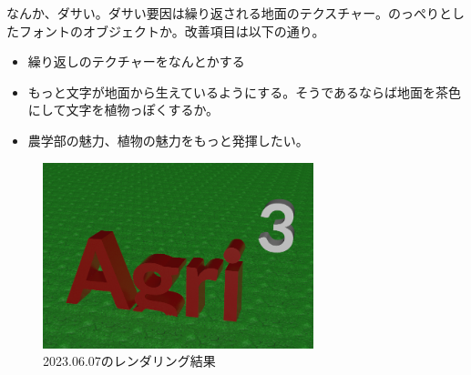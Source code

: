 \documentclass[uplatex,dvipdfmx]{jsarticle}
\begin{document}
なんか、ダサい。ダサい要因は繰り返される地面のテクスチャー。のっぺりとしたフォントのオブジェクトか。改善項目は以下の通り。

\begin{itemize}
  \item 繰り返しのテクチャーをなんとかする
  \item もっと文字が地面から生えているようにする。そうであるならば地面を茶色にして文字を植物っぽくするか。
  \item 農学部の魅力、植物の魅力をもっと発揮したい。
\end{itemize}




\begin{figure}[h]
  \centering
  \includegraphics[width=0.7\textwidth]{figs/lab_logo_230607_1.PNG}
  \caption{2023.06.07のレンダリング結果}
  \label{fig:rendered_230607_1}
\end{figure}


\printbibliography
\end{document}
